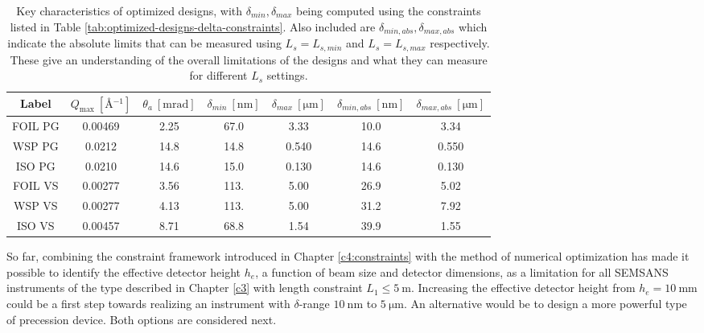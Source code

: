 \begin{table}[h!]
	\centering
	\begin{tabular}{c | c c c c | cc}
		\toprule
		Label & $Q_{\text{max}} ~[\unit{\angstrom^{-1}}]$ & $\theta_a~[\unit{\milli\radian}]$ & $\delta_{min}~[\unit{\nano\meter}]$ & $\delta_{max}~[\unit{\micro\meter}]$ & $\delta_{min,abs}~[\unit{\nano\meter}]$ & $\delta_{max,abs}~[\unit{\micro\meter}]$ \\
		\midrule
		FOIL PG & \num{0.00469} & \num{2.25} & \num{67.0} & \num{3.33} & \num{10.0} & \num{3.34} \\
		WSP PG & \num{0.0212} & \num{14.8} & \num{14.8} & \num{0.540} & \num{14.6} & \num{0.550} \\
		ISO PG & \num{0.0210} & \num{14.6} & \num{15.0} & \num{0.130} & \num{14.6} & \num{0.130} \\
		FOIL VS & \num{0.00277} & \num{3.56} & \num{113.} & \num{5.00} & \num{26.9} & \num{5.02} \\
		WSP VS & \num{0.00277} & \num{4.13} & \num{113.} & \num{5.00} & \num{31.2} & \num{7.92} \\
		ISO VS & \num{0.00457} & \num{8.71} & \num{68.8} & \num{1.54} & \num{39.9} & \num{1.55} \\
		\bottomrule
	\end{tabular}
	\caption{Key characteristics of optimized designs, with $\delta_{min}, \delta_{max}$ being computed using the constraints listed in Table \ref{tab:optimized-designs-delta-constraints}. Also included are $\delta_{min,abs}, \delta_{max,abs}$ which indicate the absolute limits that can be measured using $L_s = L_{s,min}$ and $L_s = L_{s,max}$ respectively. These give an understanding of the overall limitations of the designs and what they can measure for different $L_s$ settings.}
	\label{tab:optimized-designs-performance}
\end{table}

So far, combining the constraint framework introduced in Chapter \ref{c4:constraints} with the method of numerical optimization has made it possible to identify the effective detector height $h_e$, a function of beam size and detector dimensions, as a limitation for all SEMSANS instruments of the type described in Chapter \ref{c3} with length constraint $L_1 \leq \SI{5}{\meter}$. Increasing the effective detector height from $h_e = \SI{10}{\milli\meter}$ could be a first step towards realizing an instrument with $\delta$-range $\SI{10}{\nano\meter}$ to $ \SI{5}{\micro\meter}$. An alternative would be to design a more powerful type of precession device. Both options are considered next.

